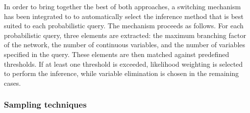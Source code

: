 In order to bring together the best of both approaches, a switching mechanism has been integrated to \opendial{} to automatically select the inference method that is best suited to each probabilistic query.  The mechanism proceeds as follows. For each probabilistic query, three elements are extracted: the maximum branching factor of the network, the number of continuous variables, and the number of variables specified in the query. These elements are then matched against predefined thresholds. If at least one threshold is exceeded, likelihood weighting is selected to perform the inference, while variable elimination is chosen in the remaining cases. 

\subsubsection*{Sampling techniques}

